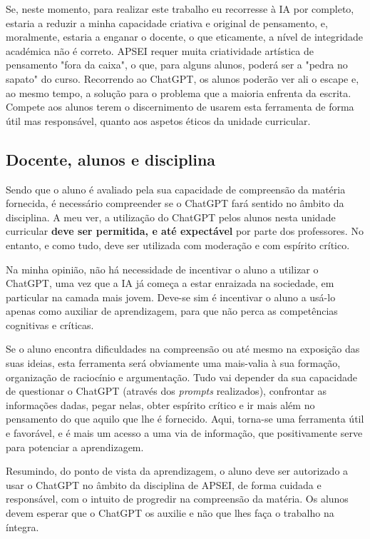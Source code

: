 \documentclass[portuguese, 11pt, a4paper, titlepage, oneside]{article}
\begin{document}
Se, neste momento, para realizar este trabalho eu recorresse à IA por completo, estaria a reduzir a minha capacidade criativa e original de pensamento, e, moralmente, estaria a enganar o docente, o que eticamente, a nível de integridade académica não é correto. APSEI requer muita criatividade artística de pensamento "fora da caixa", o que, para alguns alunos, poderá ser a "pedra no sapato" do curso. Recorrendo ao ChatGPT, os alunos poderão ver ali o escape e, ao mesmo tempo, a solução para o problema que a maioria enfrenta da escrita. Compete aos alunos terem o discernimento de usarem esta ferramenta de forma útil mas responsável, quanto aos aspetos éticos da unidade curricular.

\subsection{Docente, alunos e disciplina}
Sendo que o aluno é avaliado pela sua capacidade de compreensão da matéria fornecida, é necessário compreender se o ChatGPT fará sentido no âmbito da disciplina. A meu ver, a utilização do ChatGPT pelos alunos nesta unidade curricular \textbf{deve ser permitida, e até expectável} por parte dos professores. No entanto, e como tudo, deve ser utilizada com moderação e com espírito crítico.

Na minha opinião, não há necessidade de incentivar o aluno a utilizar o ChatGPT, uma vez que a IA já começa a estar enraizada na sociedade, em particular na camada mais jovem. Deve-se sim é incentivar o aluno a usá-lo apenas como auxiliar de aprendizagem, para que não perca as competências cognitivas e críticas.

Se o aluno encontra dificuldades na compreensão ou até mesmo na exposição das suas ideias, esta ferramenta será obviamente uma mais-valia à sua formação, organização de raciocínio e argumentação. Tudo vai depender da sua capacidade de questionar o ChatGPT (através dos \textit{prompts} realizados), confrontar as informações dadas, pegar nelas, obter espírito crítico e ir mais além no pensamento do que aquilo que lhe é fornecido. Aqui, torna-se uma ferramenta útil e favorável, e é mais um acesso a uma via de informação, que positivamente serve para potenciar a aprendizagem.

Resumindo, do ponto de vista da aprendizagem, o aluno deve ser autorizado a usar o ChatGPT no âmbito da disciplina de APSEI, de forma cuidada e responsável, com o intuito de progredir na compreensão da matéria. Os alunos devem esperar que o ChatGPT os auxilie e não que lhes faça o trabalho na íntegra.
\end{document}
